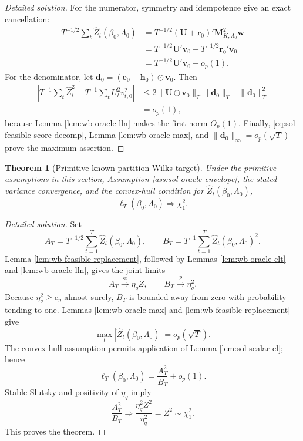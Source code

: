 \documentclass[12pt]{article}
\numberwithin{equation}{section}
\newtheorem{theorem}{Theorem}
\theoremstyle{definition}
\begin{document}
\begin{proof}[Detailed solution]
For the numerator, symmetry and idempotence give an exact cancellation:
\begin{align*}
    T^{-1/2}\sum_t\widehat Z_t(\beta_0,\Lambda_0)
    &=T^{-1/2}(\bm U+\bm r_0)'
      \bm M_{K,\Lambda_0}^2\bm w\\
    &=T^{-1/2}\bm U'\bm v_0
      +T^{-1/2}\bm r_0'\bm v_0\\
    &=T^{-1/2}\bm U'\bm v_0+o_p(1).
\end{align*}
For the denominator, let
\(\bm d_0=(\bm e_0-\bm h_0)\odot\bm v_0\).  Then
\begin{align*}
    \left|
      T^{-1}\sum_t\widehat Z_t^2
      -T^{-1}\sum_tU_t^2v_{t,0}^2
    \right|
    &\leq
      2\|\bm U\odot\bm v_0\|_T\|\bm d_0\|_T
      +\|\bm d_0\|_T^2\\
    &=o_p(1),
\end{align*}
because Lemma \ref{lem:wb-oracle-lln} makes the first norm \(O_p(1)\).
Finally, \eqref{eq:sol-feasible-score-decomp}, Lemma
\ref{lem:wb-oracle-max}, and \(\|\bm d_0\|_\infty=o_p(\sqrt T)\) prove the
maximum assertion.
\end{proof}


\begin{theorem}[Primitive known-partition Wilks target]
\label{thm:wb-known-wilks}
Under the primitive assumptions in this section, Assumption
\ref{ass:sol-oracle-envelope}, the stated variance convergence, and the
convex-hull condition for \(\widehat Z_t(\beta_0,\Lambda_0)\),
\[
    \ell_T(\beta_0,\Lambda_0)\Rightarrow\chi_1^2.
\]
\end{theorem}


\begin{proof}[Detailed solution]
Set
\[
    A_T=T^{-1/2}\sum_{t=1}^T
       \widehat Z_t(\beta_0,\Lambda_0),
    \qquad
    B_T=T^{-1}\sum_{t=1}^T
       \widehat Z_t(\beta_0,\Lambda_0)^2.
\]
Lemma \ref{lem:wb-feasible-replacement}, followed by Lemmas
\ref{lem:wb-oracle-clt} and \ref{lem:wb-oracle-lln}, gives the joint limits
\[
    A_T\xrightarrow{\mathrm{st}}\eta_qZ,
    \qquad
    B_T\xrightarrow{p}\eta_q^2.
\]
Because \(\eta_q^2\geq c_\eta\) almost surely, \(B_T\) is bounded away from
zero with probability tending to one.  Lemmas \ref{lem:wb-oracle-max} and
\ref{lem:wb-feasible-replacement} give
\[
    \max_t|\widehat Z_t(\beta_0,\Lambda_0)|=o_p(\sqrt T).
\]
The convex-hull assumption permits application of Lemma
\ref{lem:sol-scalar-el}; hence
\[
    \ell_T(\beta_0,\Lambda_0)
    =\frac{A_T^2}{B_T}+o_p(1).
\]
Stable Slutsky and positivity of \(\eta_q\) imply
\[
    \frac{A_T^2}{B_T}
    \Rightarrow
    \frac{\eta_q^2Z^2}{\eta_q^2}=Z^2\sim\chi_1^2.
\]
This proves the theorem.
\end{proof}
\end{document}
